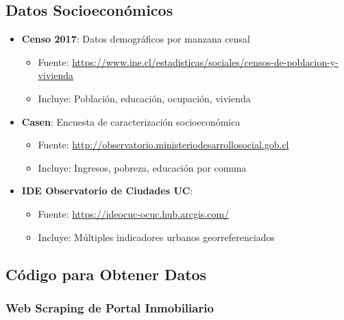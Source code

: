 \documentclass[11pt,a4paper]{article}
\begin{document}
\subsection{Datos Socioeconómicos}

\begin{itemize}
    \item \textbf{Censo 2017}: Datos demográficos por manzana censal
    \begin{itemize}
        \item Fuente: \url{https://www.ine.cl/estadisticas/sociales/censos-de-poblacion-y-vivienda}
        \item Incluye: Población, educación, ocupación, vivienda
    \end{itemize}
    
    \item \textbf{Casen}: Encuesta de caracterización socioeconómica
    \begin{itemize}
        \item Fuente: \url{http://observatorio.ministeriodesarrollosocial.gob.cl}
        \item Incluye: Ingresos, pobreza, educación por comuna
    \end{itemize}
    
    \item \textbf{IDE Observatorio de Ciudades UC}:
    \begin{itemize}
        \item Fuente: \url{https://ideocuc-ocuc.hub.arcgis.com/}
        \item Incluye: Múltiples indicadores urbanos georreferenciados
    \end{itemize}
\end{itemize}

\subsection{Código para Obtener Datos}

\subsubsection{Web Scraping de Portal Inmobiliario}
\end{document}
